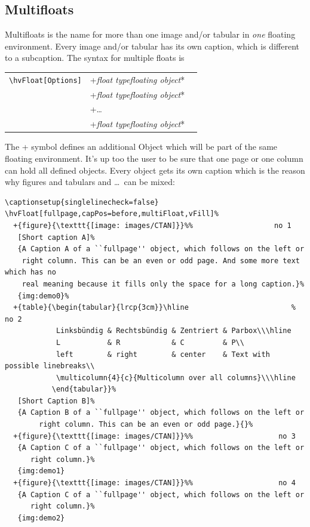 \documentclass[twoside,paper=a4,usegeometry]{scrartcl}
\makeatletter
\def\Lcs#1{\texttt{\textbackslash#1}\index{#1@\texttt{\textbackslash#1}}}
\newenvironment{BDef}
  {\begin{lrbox}{\boxdef}
      \def\arraystretch{1.0}
      \begin{tabular}{@{}l@{}l@{}l@{}}}
  {\end{tabular}\end{lrbox}
%
%
   {\BCmd\fbox{\usebox\boxdef}\endBCmd}
   \aftergroup\@afterindentfalse\aftergroup\@afterheading
  }
\def\OptArgs{\colorbox{black!20}{\texttt{[Options]}}\kern1pt}
\def\OptArg{\@ifnextchar*\OptArg@i{\OptArg@ii*}}%
\def\OptArg@i*#1{\colorbox{black!20}{\texttt{#1}}\kern1pt}
\def\OptArg@ii*#1{\colorbox{black!20}{\texttt{[#1]}}\kern1pt}
\newcommand\Larg [1]{{\normalfont\itshape#1\/}}
\newcommand\Largb[1]{\lcb\Larg{#1}\rcb}          %
\DeclareRobustCommand\lcb{{\normalfont\ttfamily\textbraceleft}}
\DeclareRobustCommand\rcb{{\normalfont\ttfamily\textbraceright}}
\makeatother
\begin{document}
\FloatBarrier


\clearpage


\subsection{Multifloats}\label{sec:multifloats}
Multifloats is the name for more than one image and/or tabular in \emph{one} floating
environment. Every image and/or tabular has its own caption, which is different to
a subcaption. The syntax for multiple floats is

\begin{BDef}
\Lcs{hvFloat}\OptArgs&+\Largb{float type}\Largb{floating object}\OptArg{short caption}\Largb{long caption}\Largb{label}\\
&+\Largb{float type}\Largb{floating object}\OptArg{short caption}\Largb{long caption}\Largb{label}\\
&+\ldots\\
&+\Largb{float type}\Largb{floating object}\OptArg{short caption}\Largb{long caption}\Largb{label}
\end{BDef}

The + symbol defines an additional Object which will be part of the same floating environment.
It's up too the user to be sure that one page or one column can hold all defined objects.
Every object gets its own caption which is the reason why figures and tabulars and \ldots\ 
can be mixed:

\begin{lstlisting}
\captionsetup{singlelinecheck=false}
\hvFloat[fullpage,capPos=before,multiFloat,vFill]%
  +{figure}{\texttt{[image: images/CTAN]}}%%                   no 1
   [Short caption A]%
   {A Caption A of a ``fullpage'' object, which follows on the left or
    right column. This can be an even or odd page. And some more text which has no
    real meaning because it fills only the space for a long caption.}%
   {img:demo0}%
  +{table}{\begin{tabular}{lrcp{3cm}}\hline                        %             no 2
            Linksbündig & Rechtsbündig & Zentriert & Parbox\\\hline
            L           & R            & C         & P\\
            left        & right        & center    & Text with possible linebreaks\\
            \multicolumn{4}{c}{Multicolumn over all columns}\\\hline
           \end{tabular}}%
   [Short Caption B]%
   {A Caption B of a ``fullpage'' object, which follows on the left or
        right column. This can be an even or odd page.}{}%
  +{figure}{\texttt{[image: images/CTAN]}}%%                    no 3
   {A Caption C of a ``fullpage'' object, which follows on the left or
      right column.}%
   {img:demo1}
  +{figure}{\texttt{[image: images/CTAN]}}%%                    no 4
   {A Caption C of a ``fullpage'' object, which follows on the left or
      right column.}%
   {img:demo2}
\end{lstlisting}
\end{document}
